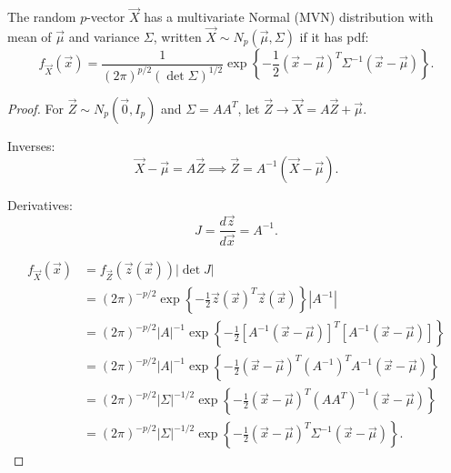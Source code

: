 \documentclass[10pt, a4paper]{article}
\begin{document}
\begin{proposition}
    The random $p$-vector $\vec{X}$ has a multivariate Normal
    (MVN)
    distribution with mean of $\vec{\mu}$ and variance $\Sigma$,
    written $\vec{X} \sim N_{p}(\vec{\mu}, \Sigma)$ if it has pdf:
    \[
    f_{\vec{X}}(\vec{x}) = \frac{1}{(2\pi) ^ {p / 2}(\det{\Sigma}) ^ {1 / 2}}\exp\left\{-\frac{1}{2}(\vec{x} - \vec{\mu}) ^ T\Sigma ^ {-1}(\vec{x} - \vec{\mu})\right\}.
    \]

    \begin{proof}
        For $\vec{Z} \sim N_p(\vec{0}, I_p)$ and $\Sigma = AA ^ T$,
        let $\vec{Z} \to \vec{X} = A\vec{Z} + \vec{\mu}$.

        Inverses:
        \[
        \vec{X} - \vec{\mu} = A\vec{Z} \implies \vec{Z} = A ^ {-1}(\vec{X} - \vec{\mu}).
        \]

        Derivatives:
        \[
        J = \frac{d\vec{z}}{d\vec{x}} = A ^ {-1}.
        \]

        \begin{align*}
            f_{\vec{X}}(\vec{x}) &= f_{\vec{Z}}(\vec{z}(\vec{x}))|\det{J}| \\
            &= (2\pi) ^ {-p / 2}\exp\left\{-\frac{1}{2}\vec{z}(\vec{x}) ^ T\vec{z}(\vec{x})\right\}|A ^ {-1}| \\
            &= (2\pi) ^ {-p / 2}|A| ^ {-1}\exp\left\{-\frac{1}{2}\left[A ^ {-1}(\vec{x} - \vec{\mu})\right] ^ T\left[A ^ {-1}(\vec{x} - \vec{\mu})\right]\right\} \\
            &= (2\pi) ^ {-p / 2}|A| ^ {-1}\exp\left\{-\frac{1}{2}(\vec{x} - \vec{\mu}) ^ T(A ^ {-1}) ^ TA ^ {-1}(\vec{x} - \vec{\mu})\right\} \\
            &= (2\pi) ^ {-p / 2}|\Sigma| ^ {-1 / 2}\exp\left\{-\frac{1}{2}(\vec{x} - \vec{\mu}) ^ T(AA ^ T) ^ {-1}(\vec{x} - \vec{\mu})\right\} \\
            &= (2\pi) ^ {-p / 2}|\Sigma| ^ {-1 / 2}\exp\left\{-\frac{1}{2}(\vec{x} - \vec{\mu}) ^ T\Sigma ^ {-1}(\vec{x} - \vec{\mu})\right\}.
        \end{align*}
    \end{proof}
\end{proposition}
\end{document}
